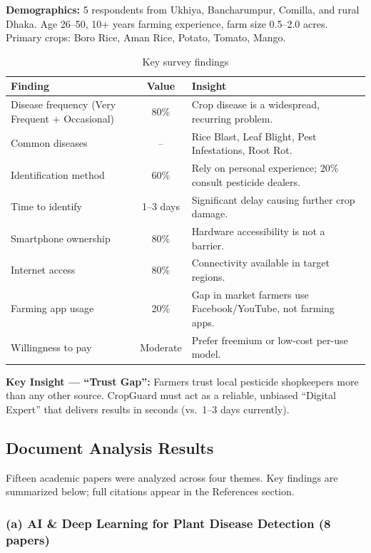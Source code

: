 \documentclass[12pt,a4paper]{article}
\begin{document}
\textbf{Demographics:} 5 respondents from Ukhiya, Bancharumpur, Comilla, and rural Dhaka. Age 26--50, 10+ years farming experience, farm size 0.5--2.0 acres. Primary crops: Boro Rice, Aman Rice, Potato, Tomato, Mango.

\begin{table}[h!]
\centering
\small
\begin{tabularx}{\textwidth}{|l|c|X|}
\hline
\rowcolor{lightgreen}
\textbf{Finding} & \textbf{Value} & \textbf{Insight} \\
\hline
Disease frequency (Very Frequent + Occasional) & 80\% & Crop disease is a widespread, recurring problem. \\
\hline
Common diseases & -- & Rice Blast, Leaf Blight, Pest Infestations, Root Rot. \\
\hline
Identification method & 60\% & Rely on personal experience; 20\% consult pesticide dealers. \\
\hline
Time to identify & 1--3 days & Significant delay causing further crop damage. \\
\hline
Smartphone ownership & 80\% & Hardware accessibility is not a barrier. \\
\hline
Internet access & 80\% & Connectivity available in target regions. \\
\hline
Farming app usage & 20\% & Gap in market  farmers use Facebook/YouTube, not farming apps. \\
\hline
Willingness to pay & Moderate & Prefer freemium or low-cost per-use model. \\
\hline
\end{tabularx}
\caption{Key survey findings}
\end{table}

\textbf{Key Insight --- ``Trust Gap'':} Farmers trust local pesticide shopkeepers more than any other source. CropGuard must act as a reliable, unbiased ``Digital Expert'' that delivers results in seconds (vs.\ 1--3 days currently).

\subsection{Document Analysis Results}

Fifteen academic papers were analyzed across four themes. Key findings are summarized below; full citations appear in the References section.

\subsubsection*{(a) AI \& Deep Learning for Plant Disease Detection (8 papers)}
\end{document}
